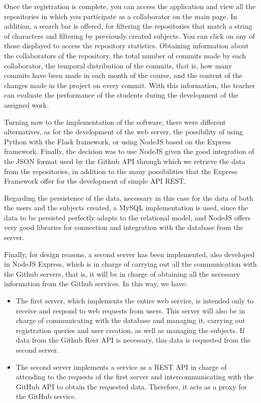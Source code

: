 Once the registration is complete, you can access the application and
view all the repositories in which you participate as a collaborator
on the main page. In addition, a search bar is offered, for filtering
the repositories that match a string of characters and filtering by
previously created subjects. You can click on any of those displayed
to access the repository statistics. Obtaining information about the
collaborators of the repository, the total number of commits made by
each collaborator, the temporal distribution of the commits, that is,
how many commits have been made in each month of the course, and the
content of the changes made in the project on every commit. With this
information, the teacher can evaluate the performance of the students
during the development of the assigned work.

Turning now to the implementation of the software, there were
different alternatives, as for the development of the web server, the
possibility of using Python\cite{Python,PhytonGithub} with the
Flask\cite{Flask} framework, or using
NodeJS\cite{NodeJS,nodeDoc,CodeShack} based on the
Express\cite{ExpressJS,GitBook,DevDocs} framework. Finally, the
decision was to use NodeJS given the good integration of the
JSON\cite{json} format used by the Github API through which we
retrieve the data from the repositories, in addition to the many
possibilities that the Express Framework offer for the development of
simple API REST.

Regarding the persistence of the data, necessary in this case for the
data of both the users and the subjects created, a MySQL\cite{MySQL}
implementation is used, since the data to be persisted perfectly
adapts to the relational model, and NodeJS offers very good libraries
for connection and integration with the database from the server.

Finally, for design reasons, a second server has been implemented,
also developed in NodeJS Express, which is in charge of carrying out
all the communication with the Github servers, that is, it will be in
charge of obtaining all the necessary information from the Github
services. In this way, we have:

\begin{itemize}
\item The first server, which implements the entire web service, is
  intended only to receive and respond to web requests from users.
  This server will also be in charge of communicating with the
  database and managing it, carrying out registration queries and user
  creation, as well as managing the subjects. If data from the Github
  Rest API is necessary, this data is requested from the second
  server.

\item The second server implements a service as a REST API in charge
  of attending to the requests of the first server and
  intercommunicating with the GitHub API to obtain the requested data.
  Therefore, it acts as a proxy for the GitHub service.
\end{itemize}

